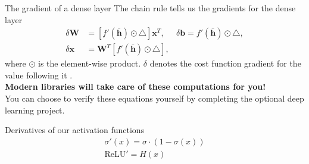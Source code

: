 \documentclass[notes]{beamer}
\begin{document}
    \begin{frame}{The gradient of a dense layer}
      The chain rule tells us the gradients for the dense layer~\cite{nielsen2015neural}
      \begin{align}
        \delta \mathbf{W} &= [f'(\bar{\mathbf{h}}) \odot \triangle]\mathbf{x}^T, &  \delta \mathbf{b} = f'(\bar{\mathbf{h}}) \odot \triangle, \\
        \delta \mathbf{x} &= \mathbf{W}^T [f'(\bar{\mathbf{h}}) \odot \triangle],
      \end{align}
      where $\odot$ is the element-wise product. $\delta$ denotes the cost function gradient for the value following it \cite{greff2016lstm}. \\
      \textbf{Modern libraries will take care of these computations for you!} \\
      You can choose to verify these equations yourself by completing the optional deep learning project.
    \end{frame}

    \begin{frame}{Derivatives of our activation functions}
      \begin{align}
        \sigma'(x) = \sigma \cdot (1 - \sigma(x)) \\
        \text{ReLU}' = H(x) 
      \end{align}
      \begin{figure}
        
        
      \end{figure}
    \end{frame}
\end{document}
